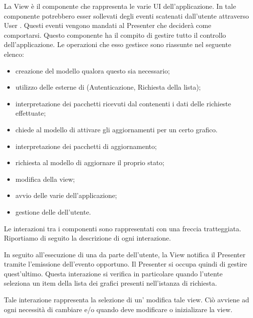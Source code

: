        La View è il componente che rappresenta le varie UI dell'applicazione. In tale componente potrebbero esser sollevati degli eventi scatenati dall'utente attraverso User . Questi eventi vengono mandati al Presenter che deciderà come comportarsi.
        Questo componente ha il compito di gestire tutto il controllo dell'applicazione. Le operazioni che esso gestisce sono riassunte nel seguente elenco:
        	\begin{itemize}
        		\item creazione del modello qualora questo sia necessario;
        		\item utilizzo delle  esterne di  (Autenticazione, Richiesta della lista);
        		\item interpretazione dei pacchetti ricevuti dal  contenenti i dati delle richieste  effettuate;
                \item chiede al modello di attivare gli aggiornamenti per un certo grafico.
        		\item interpretazione dei pacchetti di aggiornamento;
        		\item richiesta al modello di aggiornare il proprio stato;
        		\item modifica della view;
        		\item avvio delle varie  dell'applicazione;
        		\item gestione delle  dell'utente.
        \end{itemize}
    	Le interazioni tra i componenti sono rappresentati con una freccia tratteggiata.\\
    	Riportiamo di seguito la descrizione di ogni interazione.

        In seguito all'esecuzione di una  da parte dell'utente, la View notifica il Presenter tramite l'emissione dell'evento opportuno. Il Presenter si occupa quindi di gestire quest'ultimo. Questa interazione si verifica in particolare quando l'utente seleziona un item della lista dei grafici presenti nell'istanza di  richiesta.

        Tale interazione rappresenta la selezione di un' modifica tale view. Ciò avviene ad ogni necessità di cambiare  e/o quando deve modificare o inizializare la view.

